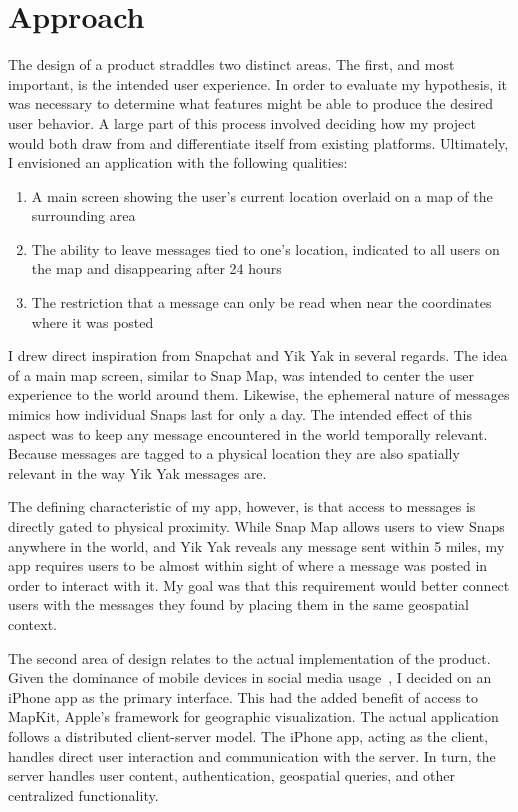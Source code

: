 \section{Approach}

The design of a product straddles two distinct areas. The first, and most important, is the intended user experience. In order to evaluate my hypothesis, it was necessary to determine what features might be able to produce the desired user behavior. A large part of this process involved deciding how my project would both draw from and differentiate itself from existing platforms. Ultimately, I envisioned an application with the following qualities:

\begin{enumerate}
    \item A main screen showing the user's current location overlaid on a map of the surrounding area
    \item The ability to leave messages tied to one's location, indicated to all users on the map and disappearing after 24 hours
    \item The restriction that a message can only be read when near the coordinates where it was posted
\end{enumerate}

I drew direct inspiration from Snapchat and Yik Yak in several regards. The idea of a main map screen, similar to Snap Map, was intended to center the user experience to the world around them. Likewise, the ephemeral nature of messages mimics how individual Snaps last for only a day. The intended effect of this aspect was to keep any message encountered in the world temporally relevant. Because messages are tagged to a physical location they are also spatially relevant in the way Yik Yak messages are.

The defining characteristic of my app, however, is that access to messages is directly gated to physical proximity. While Snap Map allows users to view Snaps anywhere in the world, and Yik Yak reveals any message sent within 5 miles, my app requires users to be almost within sight of where a message was posted in order to interact with it. My goal was that this requirement would better connect users with the messages they found by placing them in the same geospatial context.

The second area of design relates to the actual implementation of the product. Given the dominance of mobile devices in social media usage~\cite{umaine_2021}, I decided on an iPhone app as the primary interface. This had the added benefit of access to \textsf{MapKit}, Apple's framework for geographic visualization. The actual application follows a distributed client-server model. The iPhone app, acting as the client, handles direct user interaction and communication with the server. In turn, the server handles user content, authentication, geospatial queries, and other centralized functionality.

